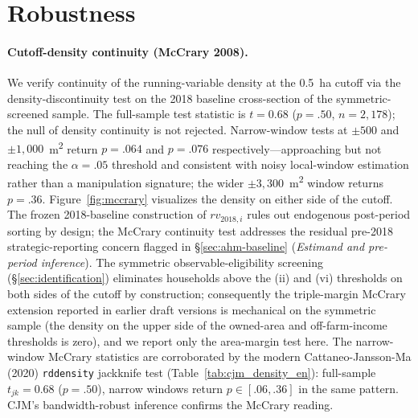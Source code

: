 \documentclass[12pt, a4paper]{article}
\begin{document}
\section{Robustness}
\label{sec:robustness}

\paragraph{Cutoff-density continuity (McCrary 2008).} We verify continuity of the running-variable density at the 0.5~ha cutoff via the \citet{McCrary2008_density} density-discontinuity test on the 2018 baseline cross-section of the symmetric-screened sample. The full-sample test statistic is $t = 0.68$ ($p = .50$, $n = 2{,}178$); the null of density continuity is not rejected. Narrow-window tests at $\pm 500$ and $\pm 1{,}000$~m\textsuperscript{2} return $p = .064$ and $p = .076$ respectively---approaching but not reaching the $\alpha = .05$ threshold and consistent with noisy local-window estimation rather than a manipulation signature; the wider $\pm 3{,}300$~m\textsuperscript{2} window returns $p = .36$. Figure~\ref{fig:mccrary} visualizes the density on either side of the cutoff. The frozen 2018-baseline construction of $rv_{2018,i}$ rules out endogenous post-period sorting by design; the McCrary continuity test addresses the residual pre-2018 strategic-reporting concern flagged in \S\ref{sec:ahm-baseline} (\textit{Estimand and pre-period inference}). The symmetric observable-eligibility screening (\S\ref{sec:identification}) eliminates households above the (ii) and (vi) thresholds on both sides of the cutoff by construction; consequently the triple-margin McCrary extension reported in earlier draft versions is mechanical on the symmetric sample (the density on the upper side of the owned-area and off-farm-income thresholds is zero), and we report only the area-margin test here. The narrow-window McCrary statistics are corroborated by the modern Cattaneo-Jansson-Ma (2020) \texttt{rddensity} jackknife test (Table~\ref{tab:cjm_density_en}): full-sample $t_{jk} = 0.68$ ($p = .50$), narrow windows return $p \in [.06, .36]$ in the same pattern. CJM's bandwidth-robust inference confirms the McCrary reading.


\end{document}
